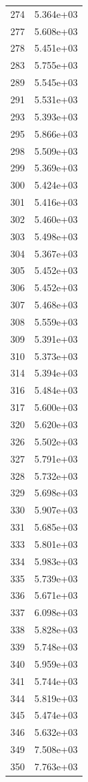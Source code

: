 \documentclass[12pt]{article}
\begin{document}
\begin{longtable}{@{}cc@{}}
274 & 5.364e+03 \\
277 & 5.608e+03 \\
278 & 5.451e+03 \\
283 & 5.755e+03 \\
289 & 5.545e+03 \\
291 & 5.531e+03 \\
293 & 5.393e+03 \\
295 & 5.866e+03 \\
298 & 5.509e+03 \\
299 & 5.369e+03 \\
300 & 5.424e+03 \\
301 & 5.416e+03 \\
302 & 5.460e+03 \\
303 & 5.498e+03 \\
304 & 5.367e+03 \\
305 & 5.452e+03 \\
306 & 5.452e+03 \\
307 & 5.468e+03 \\
308 & 5.559e+03 \\
309 & 5.391e+03 \\
310 & 5.373e+03 \\
314 & 5.394e+03 \\
316 & 5.484e+03 \\
317 & 5.600e+03 \\
320 & 5.620e+03 \\
326 & 5.502e+03 \\
327 & 5.791e+03 \\
328 & 5.732e+03 \\
329 & 5.698e+03 \\
330 & 5.907e+03 \\
331 & 5.685e+03 \\
333 & 5.801e+03 \\
334 & 5.983e+03 \\
335 & 5.739e+03 \\
336 & 5.671e+03 \\
337 & 6.098e+03 \\
338 & 5.828e+03 \\
339 & 5.748e+03 \\
340 & 5.959e+03 \\
341 & 5.744e+03 \\
344 & 5.819e+03 \\
345 & 5.474e+03 \\
346 & 5.632e+03 \\
349 & 7.508e+03 \\
350 & 7.763e+03 \\

\end{longtable}
\end{document}
